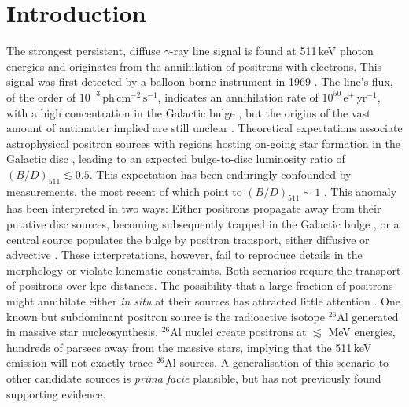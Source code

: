 \documentclass[doublespace,nopageskip]{VTthesis} %
\newcommand{\mrm}[1]{\mathrm{#1}}
\newcommand{\nuc}[2]{$\mrm{^{#2}#1}$}
\begin{document}
	\section{Introduction}\label{sec:intro}
	The strongest persistent, diffuse $\gamma$-ray line signal is found at 511\,keV photon energies and originates from the annihilation of positrons with electrons.
	This signal was first detected by a balloon-borne instrument in 1969 \citep{Johnson1973_511}.
	The line's	flux, of the order of $10^{-3}\,\mathrm{ph\,cm^{-2}\,s^{-1}}$, indicates an annihilation rate of $10^{50}\,\mathrm{e^+\,yr^{-1}}$, with a high concentration in the Galactic bulge \citep{Purcell1997_511,Knoedlseder2005_511}, but the origins of the vast amount of antimatter implied are still unclear \citep{Prantzos2011_511}.
	Theoretical expectations associate astrophysical positron sources with regions hosting on-going star formation in the Galactic disc \citep[e.g.,][]{Alexis2014_511ISM}, leading to an expected bulge-to-disc luminosity ratio of $(B/D)_{511} \lesssim 0.5$.
	This expectation has been enduringly confounded by measurements, the most recent of which point to $(B/D)_{511} \sim 1$ \citep{Siegert2016_511}.
	This anomaly has been interpreted in two ways: 
	Either positrons propagate away from their putative disc sources, becoming subsequently trapped in the Galactic bulge \citep[e.g.,][]{Prantzos2006_511,Higdon2009_511}, or a central source populates the bulge by positron transport, either diffusive \citep{Jean2009_511ISM,Martin2012_511,Alexis2014_511ISM} or advective \citep{Jean2009_511ISM,Crocker2011_FB,Panther2018_nuclear_outflow,Churazov2011_511}.
	These interpretations, however, fail to reproduce details in the morphology or violate kinematic constraints.
	Both scenarios require the transport of positrons over $\mathrm{kpc}$ distances. 
	The possibility that a large fraction of positrons might annihilate either \textit{in situ} at their sources has attracted little attention \citep[e.g.,][]{Martin2010_SN511}.
	One known but subdominant positron source is the radioactive isotope \nuc{Al}{26} generated in massive star nucleosynthesis.
	 \nuc{Al}{26} nuclei create positrons at $\lesssim$ MeV energies, hundreds of parsecs away from the massive stars, implying that the 511\,keV emission will not exactly trace \nuc{Al}{26} sources.
	A generalisation of this scenario to other candidate sources is \textit{prima facie} plausible, but has not previously found supporting evidence.
	
\end{document}
